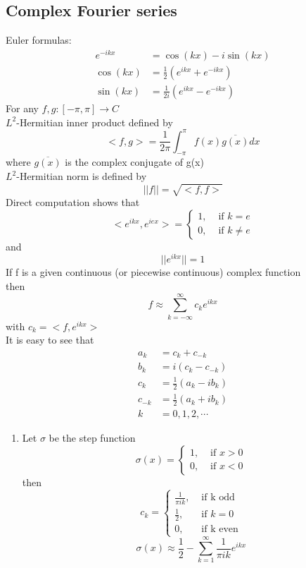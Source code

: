 \subsection{Complex Fourier series}
Euler formulas:
\begin{align*}{}{}
e^{-ikx}&=\cos(kx)-i\sin(kx)\\
\cos(kx)&=\frac{1}{2}(e^{ikx}+e^{-ikx})\\
\sin(kx)&=\frac{1}{2i}(e^{ikx}-e^{-ikx})
\end{align*}
For any $ f,g:[-\pi,\pi]\rightarrow C $ \\
$ L^2 $-Hermitian inner product defined by$$
    <f,g>=\frac{1}{2\pi}\int_{-\pi}^{\pi}f(x)\overline{g(x)}dx
$$  where $ \overline{g(x)} $ is the complex conjugate of g(x)\\
$ L^2 $-Hermitian norm is defined by$$
    ||f||=\sqrt{<f,f>}$$
Direct computation shows that$$
        <e^{ikx},e^{iex}>=\begin{cases}
            1, & \text{ if } k=e\\
            0, & \text{ if } k\neq e
        \end{cases}$$
and $$
    ||e^{ikx}||=1
$$ 
If f is a given continuous (or piecewise continuous) complex function\\
then$$
    f \approx \sum_{k=-\infty}^{\infty}c_ke^{ikx}
$$ with $ c_k=<f,e^{ikx}> $
\\It is easy to see that\begin{align*}{}{}
a_k&=c_k+c_{-k}\\
b_k&=i(c_k-c_{-k})\\
c_k&=\frac{1}{2}(a_k-ib_k)\\
c_{-k}&=\frac{1}{2}(a_k+ib_k)\\
k&=0,1,2,\cdots
\end{align*}
\begin{example}[]{}
 \begin{enumerate}[label=\circled{\arabic*}] 
 \item Let $ \sigma $ be the step function$$
    \sigma(x)=\begin{cases}
        1, & \text{ if } x>0\\
        0, & \text{ if } x<0
    \end{cases}
 $$  
 then $$
    c_k=\begin{cases}
        \frac{1}{\pi i k}, & \text{ if k odd}\\
        \frac{1}{2}, & \text{ if } k=0\\
        0,& \text{ if k even} 
    \end{cases}
 $$ 
 $$
    \sigma(x)\approx \frac{1}{2}-\sum_{k=1}^{\infty}\frac{1}{\pi i k}e^{ikx}
 $$ 
 \end{enumerate}
\end{example}
